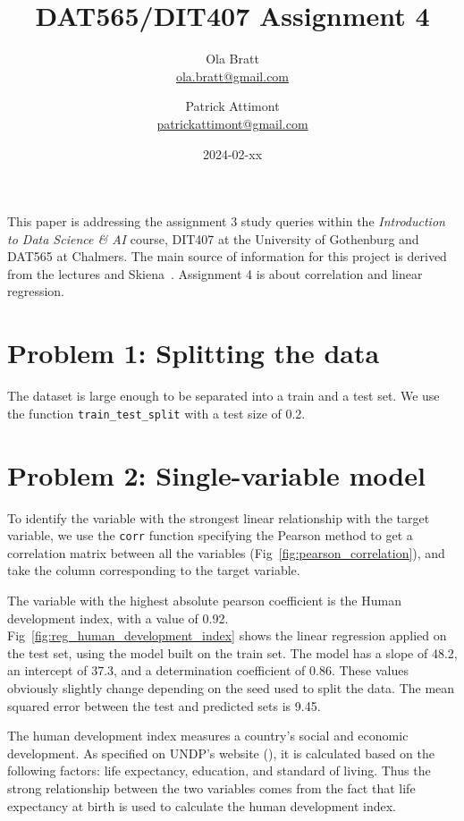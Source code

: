 \documentclass[a4paper]{article}
\begin{document}
\author{Ola Bratt \\
  \href{mailto:ola.bratt@gmail.com}{ola.bratt@gmail.com}
  \and
  Patrick Attimont \\
  \href{patrickattimont@gmail.com}{patrickattimont@gmail.com}
}

\title{DAT565/DIT407 Assignment 4}
\date{2024-02-xx}

\maketitle

This paper is addressing the assignment 3 study queries within the \emph{Introduction to Data Science \& AI} course, DIT407 at 
the University of Gothenburg and DAT565 at Chalmers. The main source of information for this project
is derived from the lectures and Skiena~\cite{Skiena:2024}. Assignment 4 is about correlation and linear regression.

\section*{Problem 1: Splitting the data}
The dataset is large enough to be separated into a train and a test set. We use the function \verb|train_test_split| with a test size of 0.2.


\section*{Problem 2: Single-variable model}
To identify the variable with the strongest linear relationship with the target variable, we use the \verb|corr| function specifying the Pearson method to get a correlation matrix between all the variables (Fig~\ref{fig:pearson_correlation}), and take the column corresponding to the target variable.

The variable with the highest absolute pearson coefficient is the Human development index, with a value of 0.92.
Fig~\ref{fig:reg_human_development_index} shows the linear regression applied on the test set, using the model built on the train set.
The model has a slope of 48.2, an intercept of 37.3, and a determination coefficient of 0.86. These values obviously slightly change depending on the seed used to split the data.
The mean squared error between the test and predicted sets is 9.45.

The human development index measures a country's social and economic development. As specified on UNDP's website (\cite{UNDP:2023}), it is calculated based on the following factors: life expectancy, education, and standard of living.
Thus the strong relationship between the two variables comes from the fact that life expectancy at birth is used to calculate the human development index.
\end{document}
